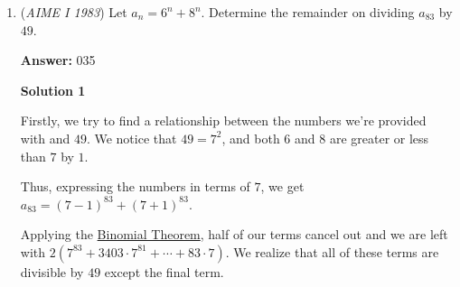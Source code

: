 \begin{enumerate}
 $2a^3-3a(2a^2-7)=10$
$-4a^3+21a=10$
$4a^3-21a+10=0$

 Since the problem is looking for $x+y=2a$ to be a positive integer, only positive half-integers (and whole-integers) need to be tested.  From the Rational Roots theorem, $a=10, a=5, a=\frac{5}{2}$ all fail, but $a=2$ does work.  Thus, the real part of both numbers is $2$, and their sum is $\boxed{004}$.

 



\textbf{Solution 3}

Begin by assuming that $x$ and $y$ are roots of some polynomial of the form $w^2+bw+c$, such that by \href{https://artofproblemsolving.com/wiki/index.php?title=Vieta\%27s\_Formulas}{Vieta's Formulas} and some algebra (left as an exercise to the reader), $b^2-2c=7$ and $3bc-b^3=10$.Substituting $c=\frac{b^2-7}{2}$, we deduce that $b^3-21b-20=0$, whose roots are $-4$, $-1$, and $5$.Since $-b$ is the sum of the roots and is maximized when $b=-4$, the answer is $-(-4)=\boxed{004}$.

 



\textbf{Solution 4}

$x^3 + y^3 = 10 = (x+y)(x^2-xy+y^2) = (x+y)(7-xy) \implies xy = 7 - \frac{10}{x+y}.$  Also, $(x+y)^3 = x^3 + 3x^2y+3xy^2+y^3 = 10 + 3xy(x+y).$  Substituting our above into this, we get $10 + 3(7-\frac{10}{x+y})(x+y) = 21x+21y-20 = (x+y)^3$.  Letting $p = x+y$, we have that $p^3 - 21p + 20 = 0$.  Testing $p = 1$, we find that this is a root, to get $(p-1)(p^2+p-20) = 0 \implies p = -5, 1, 4 \implies \boxed{4}$



	\item (\textit{AIME I 1983}) Let $a_n=6^{n}+8^{n}$. Determine the remainder on dividing $a_{83}$ by $49$.


 
 \textbf{Answer: }035



\textbf{Solution 1}

Firstly, we try to find a relationship between the numbers we're provided with and $49$. We notice that $49=7^2$, and both $6$ and $8$ are greater or less than $7$ by $1$. 

 Thus, expressing the numbers in terms of $7$, we get $a_{83} = (7-1)^{83}+(7+1)^{83}$.

 Applying the \href{https://artofproblemsolving.com/wiki/index.php?title=Binomial\_Theorem}{Binomial Theorem}, half of our terms cancel out and we are left with $2(7^{83}+3403\cdot7^{81}+\cdots + 83\cdot7)$. We realize that all of these terms are divisible by $49$ except the final term.


\end{enumerate}
